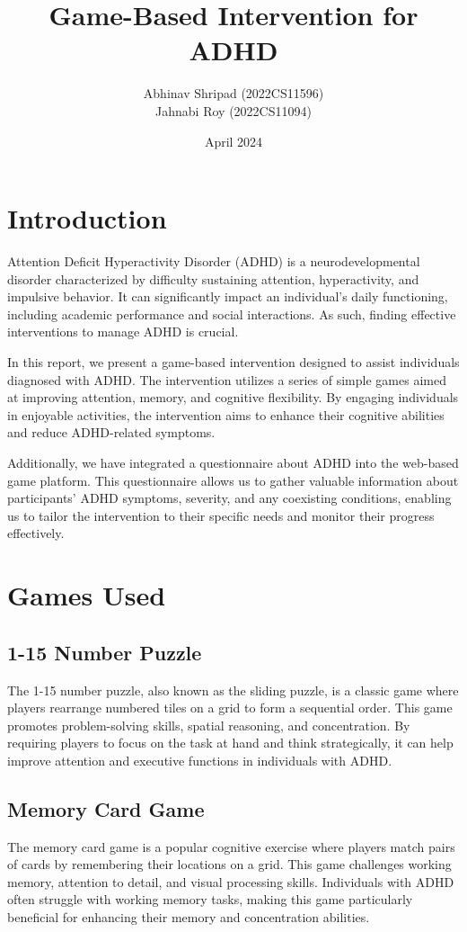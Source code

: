 \documentclass{article}
\title{\textbf{Game-Based Intervention for ADHD}}
\author{Abhinav Shripad (2022CS11596) \\ Jahnabi Roy (2022CS11094)}
\date{April 2024}
\begin{document}
\maketitle

\section{Introduction}
Attention Deficit Hyperactivity Disorder (ADHD) is a neurodevelopmental disorder characterized by difficulty sustaining attention, hyperactivity, and impulsive behavior. It can significantly impact an individual's daily functioning, including academic performance and social interactions. As such, finding effective interventions to manage ADHD is crucial.

In this report, we present a game-based intervention designed to assist individuals diagnosed with ADHD. The intervention utilizes a series of simple games aimed at improving attention, memory, and cognitive flexibility. By engaging individuals in enjoyable activities, the intervention aims to enhance their cognitive abilities and reduce ADHD-related symptoms.

Additionally, we have integrated a questionnaire about ADHD into the web-based game platform. This questionnaire allows us to gather valuable information about participants' ADHD symptoms, severity, and any coexisting conditions, enabling us to tailor the intervention to their specific needs and monitor their progress effectively.

\section{Games Used}
\subsection{1-15 Number Puzzle}
The 1-15 number puzzle, also known as the sliding puzzle, is a classic game where players rearrange numbered tiles on a grid to form a sequential order. This game promotes problem-solving skills, spatial reasoning, and concentration. By requiring players to focus on the task at hand and think strategically, it can help improve attention and executive functions in individuals with ADHD.

\subsection{Memory Card Game}
The memory card game is a popular cognitive exercise where players match pairs of cards by remembering their locations on a grid. This game challenges working memory, attention to detail, and visual processing skills. Individuals with ADHD often struggle with working memory tasks, making this game particularly beneficial for enhancing their memory and concentration abilities.
\end{document}
